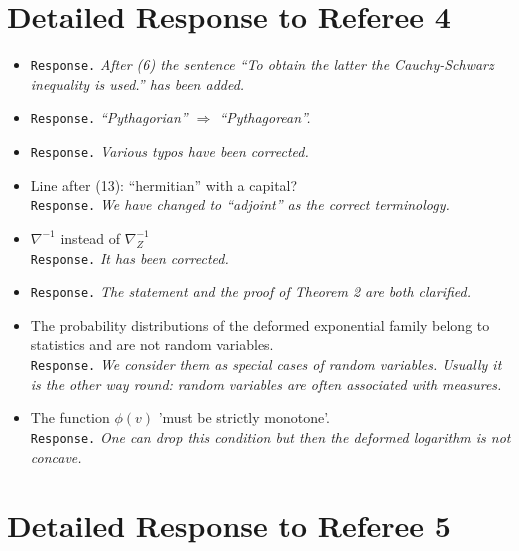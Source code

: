 \documentclass[a4paper,12pt]{article}
\begin{document}
\section{Detailed Response to Referee 4}

\begin{itemize}
\item {\tt Response.} {\it  After (6) the sentence ``To obtain the latter the Cauchy-Schwarz inequality is used.'' has been added. }

\item {\tt Response.} {\it ``Pythagorian'' $\Rightarrow$ ``Pythagorean''.}

\item {\tt Response.} {\it Various typos have been corrected.}

\item Line after (13): ``hermitian'' with a capital? \\
{\tt Response.}  {\it We have changed to ``adjoint'' as the correct terminology. } 

\item $\nabla^{-1}$ instead of $\nabla^{-1}_Z$ \\
{\tt Response.} {\it  It has been corrected.}

\item {\tt Response.} {\it  The statement and the proof of Theorem 2 are both clarified.}

\item The probability distributions of the deformed exponential family belong to statistics and are not random variables. \\
{\tt Response.} {\it We consider them as special cases of random variables. Usually it is the other way round:
 random variables are often associated with measures. }

\item The function $\phi(v)$ 'must be strictly monotone'. \\ 
{\tt Response.} {\it  One can drop this condition but then the deformed logarithm is not concave. } 
 
\end{itemize}


\section{Detailed Response to Referee 5}
\end{document}
